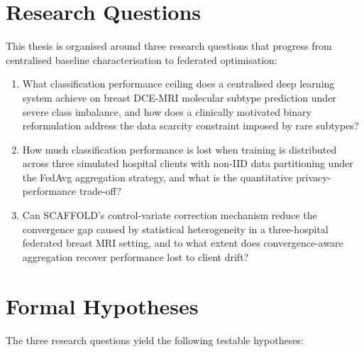 \section{Research Questions}
\label{sec:research-questions}

This thesis is organised around three research questions that progress from
centralised baseline characterisation to federated optimisation:

\begin{enumerate}

  \item[\textbf{RQ1.}] What classification performance ceiling does a centralised
  deep learning system achieve on breast DCE-MRI molecular subtype prediction
  under severe class imbalance, and how does a clinically motivated binary
  reformulation address the data scarcity constraint imposed by rare subtypes?

  \item[\textbf{RQ2.}] How much classification performance is lost when training
  is distributed across three simulated hospital clients with non-IID data
  partitioning under the FedAvg aggregation strategy, and what is the
  quantitative privacy-performance trade-off?

  \item[\textbf{RQ3.}] Can SCAFFOLD's control-variate correction mechanism reduce
  the convergence gap caused by statistical heterogeneity in a three-hospital
  federated breast MRI setting, and to what extent does convergence-aware
  aggregation recover performance lost to client drift?

\end{enumerate}

\section{Formal Hypotheses}
\label{sec:hypotheses}

The three research questions yield the following testable hypotheses:

